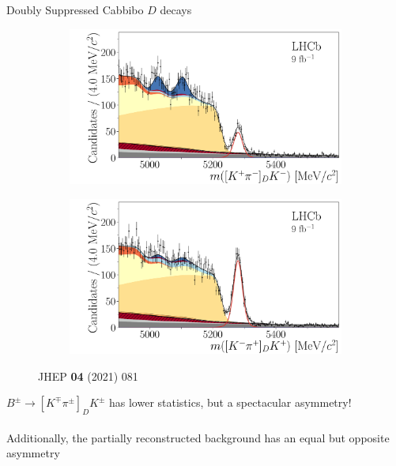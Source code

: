\documentclass{beamer}
\begin{document}
\begin{frame}{Doubly Suppressed Cabbibo $D$ decays}
  \begin{figure}
    \centering
    \begin{subfigure}{0.5\textwidth}
      \includegraphics[width = 1.0\textwidth]{Plots/B2DK_D2Kpi_Minus.pdf}
    \end{subfigure}%
    \begin{subfigure}{0.5\textwidth}
      \includegraphics[width = 1.0\textwidth]{Plots/B2DK_D2Kpi_Plus.pdf}
    \end{subfigure}
    \caption*{\tiny JHEP \textbf{04} (2021) 081}
  \end{figure}
  \vspace{-0.5cm}
  \begin{center}
    \Large $B^\pm\to[K^\mp\pi^\pm]_DK^\pm$ has lower statistics, but a spectacular asymmetry!\\~\\
    \large Additionally, the partially reconstructed background has an equal but opposite asymmetry
  \end{center}
\end{frame}
\end{document}
